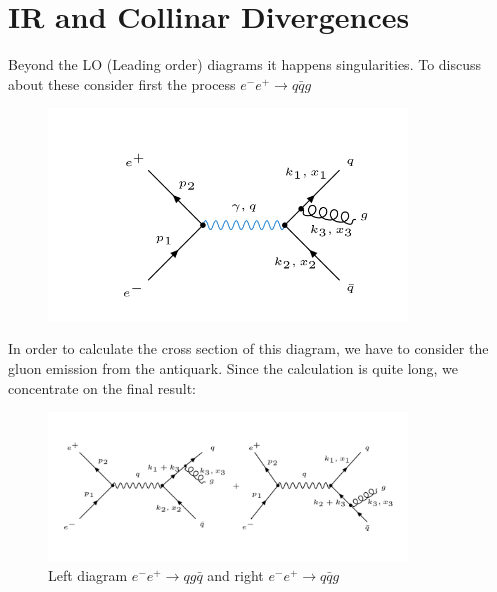 \section{IR and Collinar Divergences}
Beyond the LO (Leading order) diagrams it happens singularities. To discuss about these consider first the process $ e^- e^+ \rightarrow q\bar{q}g $

\begin{figure}[ht!]
\centering
\includegraphics[width=0.85\textwidth]{images/Intro/IRCol.png}
\end{figure}

In order to calculate the cross section of this diagram, we have to consider the gluon emission from the antiquark. Since the calculation is quite long, we concentrate on the final result:
\begin{figure}[ht!]
\centering
\includegraphics[width=0.85\textwidth]{images/Intro/IRColMatrix.png}
\caption{Left diagram $  e^- e^+ \rightarrow qg\bar{q} $ and right $ e^- e^+ \rightarrow q\bar{q}g $}
\end{figure}

